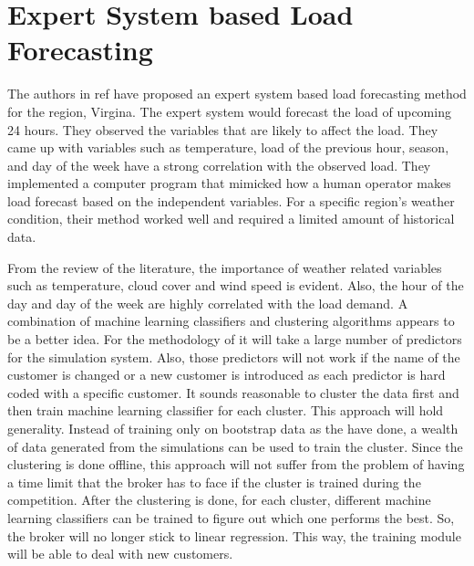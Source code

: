 \section{Expert System based Load Forecasting}
The authors in ref \cite{rahman1988expert} have proposed an expert system based load forecasting method for the region, Virgina. The expert system would forecast the load of upcoming 24 hours. They observed the variables that are likely to affect the load. They came up with variables such as temperature, load of the previous hour, season, and day of the week have a strong correlation with the observed load. They implemented a computer program that mimicked how a human operator makes load forecast based on the independent variables. For a specific region's weather condition, their method worked well and required a limited amount of historical data. 


From the review of the literature, the importance of weather related variables such as temperature, cloud cover and wind speed is evident. Also, the hour of the day and day of the week are highly correlated with the load demand. A combination of machine learning classifiers and clustering algorithms appears to be a better idea. For the methodology of \cite{parra2013initial} it will take a large number of predictors for the simulation system. Also, those predictors will not work if the name of the customer is changed or a new customer is introduced as each predictor is hard coded with a specific customer. It sounds reasonable to cluster the data first and then train machine learning classifier for each cluster. This approach will hold generality. Instead of training only on bootstrap data as the \cite{wang2015gongbroker} have done, a wealth of data generated from the simulations can be used to  train the cluster. Since the clustering is done offline, this approach will not  suffer from the problem of having a time limit that the broker has to face if the cluster is trained during the competition. After the clustering is done, for each cluster, different machine learning classifiers can be trained to figure out which one performs the best. So, the broker will no longer stick to linear regression. This way, the training module will be able to deal with new customers.

